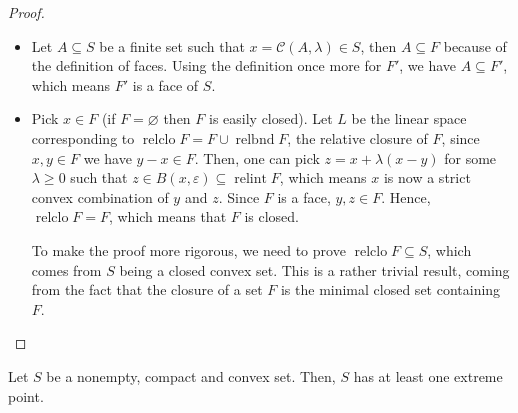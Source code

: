\begin{proof}
  \begin{itemize}
    \item Let \( A \subseteq S \) be a finite set such that \( x =
      \mathcal{C}(A, \lambda) \in S \), then \( A \subseteq F \) because of the
      definition of faces. Using the definition once more for \( F' \), we have
      \( A \subseteq F' \), which means \( F' \) is a face of \( S \).
    \item Pick \( x \in F \) (if \( F = \varnothing \) then \( F \) is easily
      closed). Let \( L \) be the linear space corresponding to \(
      \operatorname{relclo} F = F \cup \operatorname{relbnd} F \), the relative
      closure of \( F \), since \( x, y \in F \) we have \( y - x \in F \).
      Then, one can pick \( z = x + \lambda(x - y) \) for some \( \lambda \ge 0
      \) such that \( z \in B(x, \varepsilon) \subseteq \operatorname{relint } F
      \), which means \( x \) is now a strict convex combination of \( y \) and
      \( z \). Since \( F \) is a face, \( y, z \in F \). Hence, \(
      \operatorname{relclo} F = F \), which means that \( F \) is closed.

      To make the proof more rigorous, we need to prove \( \operatorname{relclo}
      F \subseteq S\), which comes from \( S \) being a closed convex set. This
      is a rather trivial result, coming from the fact that the closure of a set
      \( F \) is the minimal closed set containing \( F \).
  \end{itemize}
\end{proof}


\begin{theorem}
  Let \( S \) be a nonempty, compact and convex set. Then, \( S \) has at least
  one extreme point.
\end{theorem}

